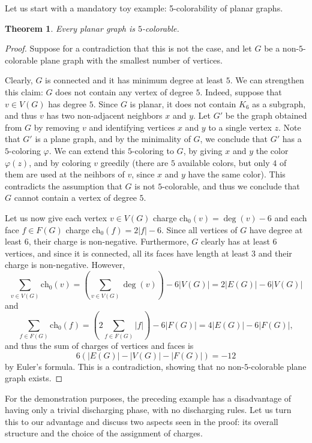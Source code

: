 \documentclass[12pt,twoside,openright,a4paper]{book}
\newtheorem{theorem}{Theorem}[chapter]
\newcommand{\initch}{\text{ch}_0}
\begin{document}
Let us start with a mandatory toy example: 5-colorability of planar graphs.

\begin{theorem}\label{thm:planar5col}
Every planar graph is $5$-colorable.
\end{theorem}
\begin{proof}
Suppose for a contradiction that this is not the case, and let $G$ be a non-$5$-colorable plane graph
with the smallest number of vertices.

Clearly, $G$ is connected and it has minimum degree at least $5$.  We can strengthen this claim: $G$ does not
contain any vertex of degree $5$.  Indeed, suppose that $v\in V(G)$ has degree $5$.  Since $G$ is planar, it does
not contain $K_6$ as a subgraph, and thus $v$ has two non-adjacent neighbors $x$ and $y$.  Let $G'$ be the graph obtained
from $G$ by removing $v$ and identifying vertices $x$ and $y$ to a single vertex $z$.  Note that $G'$ is a plane graph,
and by the minimality of $G$, we conclude that $G'$ has a $5$-coloring $\varphi$.  We can extend this $5$-coloring to $G$,
by giving $x$ and $y$ the color $\varphi(z)$, and by coloring $v$ greedily (there are $5$ available colors, but only
$4$ of them are used at the neihbors of $v$, since $x$ and $y$ have the same color).  This contradicts the assumption
that $G$ is not $5$-colorable, and thus we conclude that $G$ cannot contain a vertex of degree $5$.

Let us now give each vertex $v\in V(G)$ charge $\initch(v)=\deg(v)-6$ and each face $f\in F(G)$ charge $\initch(f)=2|f|-6$.
Since all vertices of $G$ have degree at least $6$, their charge is non-negative.  Furthermore, $G$ clearly has at least $6$
vertices, and since it is connected, all its faces have length at least $3$ and their charge is non-negative.
However,
$$\sum_{v\in V(G)} \initch(v)=\left(\sum_{v\in V(G)} \deg(v)\right)-6|V(G)|=2|E(G)|-6|V(G)|$$
and
$$\sum_{f\in F(G)} \initch(f)=\left(2\sum_{f\in F(G)} |f|\right)-6|F(G)|=4|E(G)|-6|F(G)|,$$
and thus the sum of charges of vertices and faces is
$$6(|E(G)|-|V(G)|-|F(G)|)=-12$$
by Euler's formula.  This is a contradiction, showing that no non-$5$-colorable plane graph exists.
\end{proof}

For the demonstration purposes, the preceding example has a disadvantage of
having only a trivial discharging phase, with no discharging rules.  Let us
turn this to our advantage and discuss two aspects seen in the proof: its
overall structure and the choice of the assignment of charges.
\end{document}
